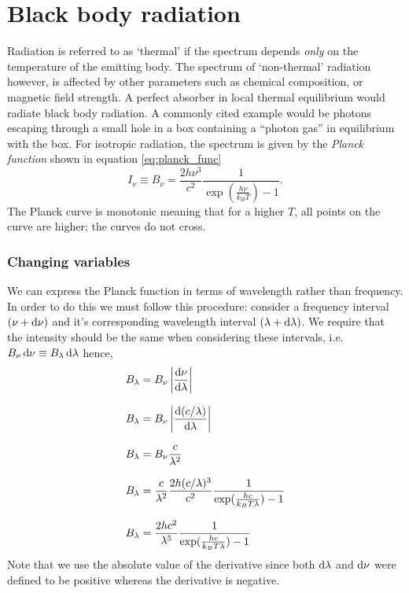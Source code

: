 \section{Black body radiation}
Radiation is referred to as `thermal' if the spectrum depends \emph{only} on the temperature of the emitting body.
 The spectrum of `non-thermal' radiation however, is affected by other parameters such as chemical composition, or magnetic field strength.
 A perfect absorber in local thermal equilibrium would radiate black body radiation.
 A commonly cited example would be photons escaping through a small hole in a box containing a ``photon gas'' in equilibrium with the box.
 For isotropic radiation, the spectrum is given by the \emph{Planck function} shown in equation \ref{eq:planck_func}
%
\begin{equation}
	I_\nu \equiv B_\nu = \frac{2 h \nu ^3}{c^2} \frac{1}{\exp(\frac{h \nu}{k_B T}) - 1}.
	\label{eq:planck_func}
\end{equation}
%
The Planck curve is monotonic meaning that for a higher $T$, all points on the curve are higher; the curves do not cross.
%
\subsubsection{Changing variables}
We can express the Planck function in terms of wavelength rather than frequency.
 In order to do this we must follow this procedure:
 consider a frequency interval $(\nu + \mathop{}\!\mathrm{d} \nu)$ and it's corresponding wavelength interval $(\lambda + \mathop{}\!\mathrm{d} \lambda)$.
 We require that the intensity should be the same when considering these intervals, i.e.\ $B_\nu \mathop{}\!\mathrm{d} \nu \equiv B_\lambda \mathop{}\!\mathrm{d} \lambda$ hence,
%
\begin{align}
	B_\lambda &= B_\nu \left| \frac{\diff\nu}{\diff\lambda} \right|				\nonumber
	\linedrop
	B_\lambda &= B_\nu \left| \frac{\diff (c/\lambda)}{\diff\lambda}\right|		\nonumber
	\linedrop
	B_\lambda &= B_\nu \frac{c}{\lambda^2}										\nonumber
	\linedrop
	B_\lambda &= \frac{c}{\lambda^2} \frac{2 h (c/\lambda)^3}{c^2} \frac{1}{\exp(\frac{h c}{k_B T \lambda}) - 1} \nonumber
	\linedrop
	B_\lambda &= \frac{2 h c^2}{\lambda^5} \frac{1}{\exp(\frac{h c}{k_B T \lambda}) - 1}
\end{align}
%
Note that we use the absolute value of the derivative since both $\mathop{}\!\mathrm{d}\lambda$ and $\mathop{}\!\mathrm{d}\nu$ were defined to be positive whereas the derivative is negative.













